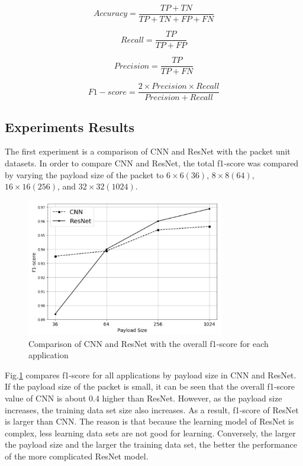 \begin{equation}
Accuracy =  \frac{TP + TN}{TP + TN + FP + FN}
\end{equation}

\begin{equation}
Recall =  \frac{TP}{TP + FP}
\end{equation}

\begin{equation}
Precision =  \frac{TP}{TP + FN}
\end{equation}

\begin{equation}
F1-score =  \frac{2 \times Precision \times Recall}{Precision + Recall}
\end{equation}

\subsection{Experiments Results}
The first experiment is a comparison of CNN and ResNet with the packet unit datasets.
In order to compare CNN and ResNet, the total f1-score was compared by varying the payload size of the packet to $6 \times 6 (36)$, $8 \times 8 (64)$, $16 \times 16 (256)$, and $32 \times 32 (1024)$.

\begin{figure}[t]
\centering
{
\includegraphics[width=3.4in]{fig7.jpg}
\caption{Comparison of CNN and ResNet with the overall f1-score for each application}
\label{fig7}
}
\end{figure}

Fig.\ref{fig7} compares f1-score for all applications by payload size in CNN and ResNet.
If the payload size of the packet is small, it can be seen that the overall f1-score value of CNN is about 0.4 higher than ResNet.
However, as the payload size increases, the training data set size also increases.
As a result, f1-score of ResNet is larger than CNN.
The reason is that because the learning model of ResNet is complex, less learning data sets are not good for learning.
Conversely, the larger the payload size and the larger the training data set, the better the performance of the more complicated ResNet model.

